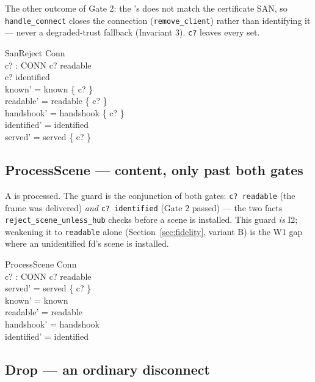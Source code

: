 \documentclass[a4paper,10pt,fleqn]{article}
\begin{document}
The other outcome of Gate 2: the 's 
does not match the certificate SAN, so \texttt{handle\_connect} closes the
connection (\texttt{remove\_client}) rather than identifying it --- never a
degraded-trust fallback (Invariant 3).  \texttt{c?} leaves every set.

\begin{schema}{SanReject}
  \Delta Conn \\
  c? : CONN
\where
  c? \in readable \\
  c? \notin identified \\
  known' = known \setminus \{ c? \} \\
  readable' = readable \setminus \{ c? \} \\
  handshook' = handshook \setminus \{ c? \} \\
  identified' = identified \\
  served' = served \setminus \{ c? \}
\end{schema}

\subsection{ProcessScene --- content, only past both gates}

A  is processed.  The guard is the conjunction of both
gates: \texttt{c? \in readable} (the frame was delivered) \emph{and}
\texttt{c? \in identified} (Gate 2 passed) --- the two facts
\texttt{reject\_scene\_unless\_hub} checks before a scene is installed.
This guard \emph{is} I2; weakening it to \texttt{readable} alone
(Section~\ref{sec:fidelity}, variant B) is the W1 gap where an
unidentified fd's scene is installed.

\begin{schema}{ProcessScene}
  \Delta Conn \\
  c? : CONN
\where
  c? \in readable \\
  served' = served \cup \{ c? \} \\
  known' = known \\
  readable' = readable \\
  handshook' = handshook \\
  identified' = identified
\end{schema}

\subsection{Drop --- an ordinary disconnect}
\end{document}
